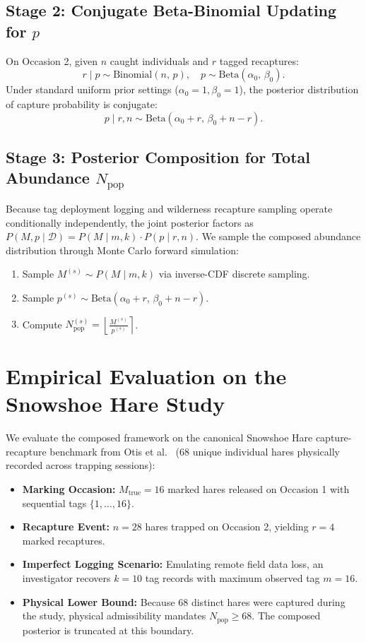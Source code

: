 \documentclass[11pt,a4paper]{article}
\begin{document}
\subsection{Stage 2: Conjugate Beta-Binomial Updating for \texorpdfstring{$p$}{p}}
On Occasion 2, given $n$ caught individuals and $r$ tagged recaptures:
\begin{equation}
r \mid p \sim \text{Binomial}(n, \, p), \quad p \sim \text{Beta}(\alpha_0, \, \beta_0).
\end{equation}
Under standard uniform prior settings ($\alpha_0 = 1, \beta_0 = 1$), the posterior distribution of capture probability is conjugate:
\begin{equation}
p \mid r, n \sim \text{Beta}(\alpha_0 + r, \, \beta_0 + n - r).
\end{equation}

\subsection{Stage 3: Posterior Composition for Total Abundance \texorpdfstring{$N_{\text{pop}}$}{N\_pop}}
Because tag deployment logging and wilderness recapture sampling operate conditionally independently, the joint posterior factors as $P(M, p \mid \mathcal{D}) = P(M \mid m, k) \cdot P(p \mid r, n)$. We sample the composed abundance distribution through Monte Carlo forward simulation:
\begin{enumerate}
    \item Sample $M^{(s)} \sim P(M \mid m, k)$ via inverse-CDF discrete sampling.
    \item Sample $p^{(s)} \sim \text{Beta}(\alpha_0 + r, \, \beta_0 + n - r)$.
    \item Compute $N_{\text{pop}}^{(s)} = \left\lfloor \frac{M^{(s)}}{p^{(s)}} \right\rceil$.
\end{enumerate}

\section{Empirical Evaluation on the Snowshoe Hare Study}

We evaluate the composed framework on the canonical Snowshoe Hare capture-recapture benchmark from Otis et al.~\cite{otis1978} ($68$ unique individual hares physically recorded across trapping sessions):
\begin{itemize}
    \item \textbf{Marking Occasion:} $M_{\text{true}} = 16$ marked hares released on Occasion 1 with sequential tags $\{1, \dots, 16\}$.
    \item \textbf{Recapture Event:} $n = 28$ hares trapped on Occasion 2, yielding $r = 4$ marked recaptures.
    \item \textbf{Imperfect Logging Scenario:} Emulating remote field data loss, an investigator recovers $k = 10$ tag records with maximum observed tag $m = 16$.
    \item \textbf{Physical Lower Bound:} Because 68 distinct hares were captured during the study, physical admissibility mandates $N_{\text{pop}} \ge 68$. The composed posterior is truncated at this boundary.
\end{itemize}
\end{document}
